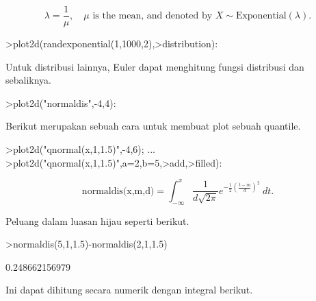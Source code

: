 \documentclass[a4paper,10pt]{article}
\begin{document}
\begin{eulernotebook}
\begin{eulercomment}
\end{eulercomment}
\begin{eulerformula}
\[
\lambda=\frac{1}{\mu},\quad \mu \text{ is the mean, and denoted by } X \sim \text{Exponential}(\lambda).
\]
\end{eulerformula}
\begin{eulerprompt}
>plot2d(randexponential(1,1000,2),>distribution):
\end{eulerprompt}
\begin{eulercomment}
Untuk distribusi lainnya, Euler dapat menghitung fungsi distribusi dan sebaliknya.
\end{eulercomment}
\begin{eulerprompt}
>plot2d("normaldis",-4,4): 
\end{eulerprompt}
\begin{eulercomment}
Berikut merupakan sebuah cara untuk membuat plot sebuah quantile.
\end{eulercomment}
\begin{eulerprompt}
>plot2d("qnormal(x,1,1.5)",-4,6);  ...
>plot2d("qnormal(x,1,1.5)",a=2,b=5,>add,>filled):
\end{eulerprompt}
\begin{eulerformula}
\[
\text{normaldis(x,m,d)}=\int_{-\infty}^x \frac{1}{d\sqrt{2\pi}}e^{-\frac{1}{2}(\frac{t-m}{d})^2}\ dt.
\]
\end{eulerformula}
\begin{eulercomment}
Peluang dalam luasan hijau seperti berikut.
\end{eulercomment}
\begin{eulerprompt}
>normaldis(5,1,1.5)-normaldis(2,1,1.5)
\end{eulerprompt}
\begin{euleroutput}
  0.248662156979
\end{euleroutput}
\begin{eulercomment}
Ini dapat dihitung secara numerik dengan integral berikut.


\end{eulercomment}
\end{eulernotebook}
\end{document}

